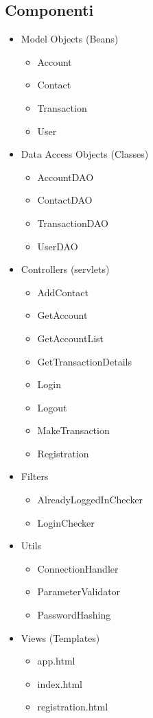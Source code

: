 \documentclass{article}
\begin{document}
\subsection{Componenti}
\begin{itemize}
	\item Model Objects (Beans)
	\begin{itemize}
		\item Account
		\item Contact
		\item Transaction
		\item User
	\end{itemize}
	\item Data Access Objects (Classes)
	\begin{itemize}
		\item AccountDAO
		\item ContactDAO
		\item TransactionDAO
		\item UserDAO
	\end{itemize}
	\item Controllers (servlets)
	\begin{itemize}
		\item AddContact
		\item GetAccount
		\item GetAccountList
		\item GetTransactionDetails
		\item Login
		\item Logout
		\item MakeTransaction
		\item Registration
	\end{itemize}
	\item Filters
	\begin{itemize}
		\item AlreadyLoggedInChecker
		\item LoginChecker
	\end{itemize}
	\item Utils
	\begin{itemize}
		\item ConnectionHandler
		\item ParameterValidator
		\item PasswordHashing
	\end{itemize}
	\item Views (Templates)
	\begin{itemize}
		\item app.html
		\item index.html
		\item registration.html
	\end{itemize}
\end{itemize}
\end{document}
